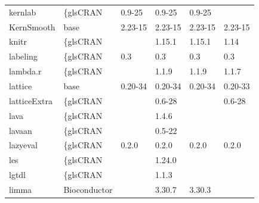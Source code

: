 \begin{longtable}{llllll}
\rowcolor{black!10}
kernlab                       & \{gls{CRAN}                      & 0.9-25      & 0.9-25      & 0.9-25         &                   \\
\rowcolor{black!5}
KernSmooth                    & base                      & 2.23-15     & 2.23-15     & 2.23-15        & 2.23-15            \\
\rowcolor{black!10}
knitr                         & \{gls{CRAN}                      &             & 1.15.1      & 1.15.1         & 1.14              \\
\rowcolor{black!5}
labeling                      & \{gls{CRAN}                      & 0.3         & 0.3         & 0.3            & 0.3                \\
\rowcolor{black!10}
lambda.r                      & \{gls{CRAN}                      &             & 1.1.9       & 1.1.9          & 1.1.7             \\
\rowcolor{black!5}
lattice                       & base                      & 0.20-34     & 0.20-34     & 0.20-34        & 0.20-33            \\
\rowcolor{black!10}
latticeExtra                  & \{gls{CRAN}                      &             & 0.6-28      &                & 0.6-28            \\
\rowcolor{black!5}
lava                          & \{gls{CRAN}                      &             & 1.4.6       &                &                    \\
\rowcolor{black!10}
lavaan                        & \{gls{CRAN}                      &             & 0.5-22      &                &                   \\
\rowcolor{black!5}
lazyeval                      & \{gls{CRAN}                      & 0.2.0       & 0.2.0       & 0.2.0          & 0.2.0              \\
\rowcolor{black!10}
les                           & \{gls{CRAN}                      &             & 1.24.0      &                &                   \\
\rowcolor{black!5}
lgtdl                         & \{gls{CRAN}                      &             & 1.1.3       &                &                    \\
\rowcolor{black!10}
limma                         & Bioconductor              &             & 3.30.7      & 3.30.3         &                   \\

\end{longtable}
